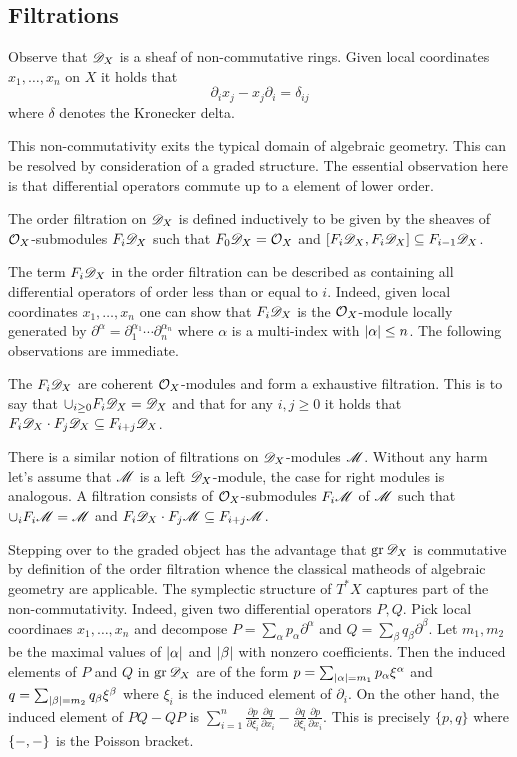 \subsection{Filtrations}
Observe that $\mathscr{D}_X$ is a sheaf of non-commutative rings.
Given local coordinates $x_1,\ldots, x_n$ on $X$ it holds that
$$\partial_i x_j - x_j\partial_i = \delta_{ij} $$
where $\delta$ denotes the Kronecker delta.

This non-commutativity exits the typical domain of algebraic geometry.
This can be resolved by consideration of a graded structure.
The essential observation here is that differential operators commute up to a element of lower order.
\begin{definition}
  The order filtration on $\mathscr{D}_X$ is defined inductively to be given by the sheaves of $\mathcal{O}_X$-submodules $F_i \mathscr{D}_X$ such that $F_0\mathscr{D}_X = \mathcal{O}_X$ and $[F_i\mathscr{D}_X, F_i \mathscr{D}_X] \subseteq F_{i-1}\mathscr{D}_X$.
\end{definition}
The term $F_i \mathscr{D}_X$ in the order filtration can be described as containing all differential operators of order less than or equal to $i$.
Indeed, given local coordinates $x_1,\ldots, x_n$ one can show that $F_i\mathscr{D}_X$ is the $\mathcal{O}_X$-module locally generated by $\partial^\alpha = \partial_1^{\alpha_1}\cdots \partial_n^{\alpha_n}$ where $\alpha$ is a multi-index with $\vert \alpha \vert\leq n$.
The following observations are immediate.
\begin{lemma}
  The $F_i\mathscr{D}_X$ are coherent $\mathcal{O}_X$-modules and form a exhaustive filtration. This is to say that $\cup_{i\geq 0}F_i\mathscr{D}_X = \mathscr{D}_X$
  and that for any $i,j\geq 0$ it holds that $F_i\mathscr{D}_X \cdot F_j \mathscr{D}_X \subseteq F_{i+j}\mathscr{D}_X$.
\end{lemma}
There is a similar notion of filtrations on $\mathscr{D}_X$-modules $\mathscr{M}$.
Without any harm let's assume that $\mathscr{M}$ is a left $\mathscr{D}_X$-module, the case for right modules is analogous.
A filtration consists of $\mathcal{O}_X$-submodules $F_i\mathscr{M}$ of $\mathscr{M}$ such that $\cup_i F_i \mathscr{M} = \mathscr{M}$ and $F_i\mathscr{D}_X \cdot F_j\mathscr{M} \subseteq F_{i+j}\mathscr{M}$.

Stepping over to the graded object has the advantage that $\operatorname{gr} \mathscr{D}_X$ is commutative by definition of the order filtration whence the classical matheods of algebraic geometry are applicable.
The symplectic structure of $T^* X$ captures part of the non-commutativity.
Indeed, given two differential operators $P, Q$.
Pick local coordinaes $x_1,\ldots, x_n$ and decompose $P = \sum_{\alpha} p_\alpha \partial^\alpha $ and $Q = \sum_{\beta} q_\beta \partial^\beta$.
Let $m_1,m_2$ be the maximal values of $\vert \alpha \vert$ and $\vert \beta \vert$ with nonzero coefficients.
Then the induced elements of $P$ and $Q$ in $\operatorname{gr} \mathscr{D}_X$ are of the form $p = \sum_{\vert \alpha \vert = m_1} p_\alpha \xi^\alpha$ and $q = \sum_{\vert \beta \vert = m_2}q_\beta \xi^\beta $ where $\xi_i$ is the induced element of $\partial_i$.
On the other hand, the induced element of $PQ - QP$ is $\sum_{i=1}^n\frac{\partial p}{\partial \xi_i}\frac{\partial q}{\partial x_i} - \frac{\partial q}{\partial \xi_i}\frac{\partial p}{\partial x_i}$.
This is precisely $\{p,q\}$ where $\{{-},{-}\}$ is the Poisson bracket.

